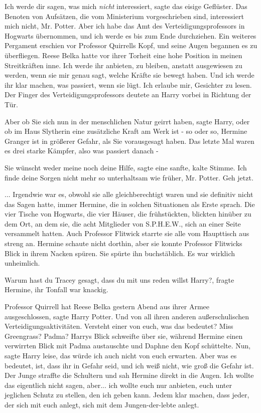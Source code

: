 \glqq{}Ich werde dir sagen, was mich \emph{nicht} interessiert\grqq{}, sagte das
eisige Geflüster. \glqq{}Das Benoten von Aufsätzen, die vom Ministerium
vorgeschrieben sind, interessiert mich nicht, Mr. Potter. Aber ich habe das Amt
des Verteidigungsprofessors in Hogwarts übernommen, und ich werde es bis zum
Ende durchziehen.\grqq{} Ein weiteres Pergament erschien vor Professor Quirrells
Kopf, und seine Augen begannen es zu überfliegen. \glqq{}Reese Belka hatte vor
ihrer Torheit eine hohe Position in meinen Streitkräften inne. Ich werde ihr
anbieten, zu bleiben, anstatt ausgewiesen zu werden, wenn sie mir genau sagt,
welche Kräfte sie bewegt haben. Und ich werde ihr klar machen, was passiert,
wenn sie lügt. Ich erlaube mir, Gesichter zu lesen.\grqq{} Der Finger des
Verteidigungsprofessors deutete an Harry vorbei in Richtung der Tür.

\glqq{}Aber ob Sie sich nun in der menschlichen Natur geirrt haben\grqq{}, sagte
Harry, \glqq{}oder ob im Haus Slytherin eine zusätzliche Kraft am Werk ist - so
oder so, Hermine Granger ist in größerer Gefahr, als Sie vorausgesagt haben. Das
letzte Mal waren es drei starke Kämpfer, also was passiert danach -\grqq{}

\glqq{}Sie wünscht weder meine noch deine Hilfe\grqq{}, sagte eine sanfte, kalte
Stimme. \glqq{}Ich finde deine Sorgen nicht mehr so unterhaltsam wie früher, Mr.
Potter. Geh jetzt.\grqq{}

... Irgendwie war es, obwohl sie alle gleichberechtigt waren und sie definitiv
nicht das Sagen hatte, immer Hermine, die in solchen Situationen als Erste
sprach. Die vier Tische von Hogwarts, die vier Häuser, die frühstückten,
blickten hinüber zu dem Ort, an dem sie, die acht Mitglieder von S.P.H.E.W.,
sich an einer Seite versammelt hatten. Auch Professor Flitwick starrte sie alle
vom Haupttisch aus streng an. Hermine schaute nicht dorthin, aber sie konnte
Professor Flitwicks Blick in ihrem Nacken spüren. Sie spürte ihn buchstäblich.
Es war wirklich unheimlich.

\glqq{}Warum hast du Tracey gesagt, dass du mit uns reden willst Harry?\grqq{},
fragte Hermine, ihr Tonfall war knackig.

\glqq{}Professor Quirrell hat Reese Belka gestern Abend aus ihrer Armee
ausgeschlossen\grqq{}, sagte Harry Potter. \glqq{}Und von all ihren anderen
außerschulischen Verteidigungsaktivitäten. Versteht einer von euch, was das
bedeutet? Miss Greengrass? Padma?\grqq{} Harrys Blick schweifte über sie,
während Hermine einen verwirrten Blick mit Padma austauschte und Daphne den Kopf
schüttelte. \glqq{}Nun\grqq{}, sagte Harry leise, \glqq{}das würde ich auch nicht
von euch erwarten. Aber was es bedeutet, ist, dass ihr in Gefahr seid, und ich
weiß nicht, wie groß die Gefahr ist.\grqq{} Der Junge straffte die Schultern und
sah Hermine direkt in die Augen. \glqq{}Ich wollte das eigentlich nicht sagen,
aber... ich wollte euch nur anbieten, euch unter jeglichen Schutz zu stellen,
den ich geben kann. Jedem klar machen, dass jeder, der sich mit euch anlegt,
sich mit dem Jungen-der-lebte anlegt.\grqq{}

